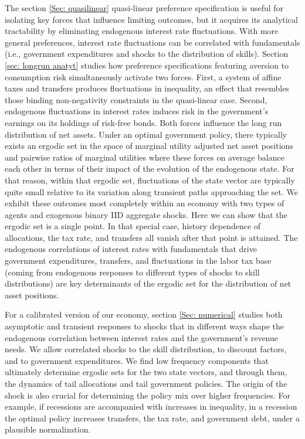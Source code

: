 \documentclass[thmsb,11pt]{article}
\begin{document}
The section \ref{Sec: quasilinear} quasi-linear preference specification is useful for isolating key forces that influence
limiting outcomes, but it acquires its analytical tractability by eliminating endogenous interest rate fluctuations. With more general
preferences, interest rate fluctuations can be correlated with fundamentals (i.e., government expenditures and shocks to the distribution
of skills). Section \ref{sec: longrun anatyt} studies how preference specifications
featuring aversion to consumption risk simultaneously activate two forces.  First, a system of affine taxes and transfers produces fluctuations in inequality, an  effect that resembles those binding non-negativity constraints in the quasi-linear case.  Second, endogenous fluctuations in interest rates  induces risk in the government's earnings on its holdings of risk-free bonds. Both forces influence the long run distribution of net assets. Under an optimal government policy, there typically exists an ergodic set in the space of marginal utility adjusted net asset positions and pairwise ratios of marginal utilities where these forces on average balance each other in terms of their impact of the evolution of the endogenous
state. For that reason, within that ergodic set, fluctuations of the state vector are typically quite small relative to its variation along transient paths approaching the set. We exhibit these outcomes most completely within an economy with two types of agents and  exogenous binary IID aggregate shocks.  Here  we can show that the ergodic set is a single point. In that special case, history dependence
of allocations, the tax rate, and transfers all vanish after that point is attained. The endogenous correlations of interest rates with fundamentals
that  drive government
expenditures, transfers, and  fluctuations in the labor tax base (coming from endogenous responses to different types of shocks to skill distributions) are key determinants of the ergodic set for the distribution of net asset positions.

 For a calibrated version of our economy, section \ref{Sec: numerical} studies both asymptotic and transient responses to shocks
 that    in different ways shape the endogenous correlation between interest rates and the government's revenue needs.  We allow correlated shocks
 to the skill distribution, to discount factors, and to government expenditures.
We find  low frequency components that ultimately determine  ergodic sets for the two state vectors, and through them, the dynamics of tail allocations and tail government policies.  The origin of the shock is also crucial for determining the policy mix over higher frequencies. For example, if recessions are accompanied with increases in inequality, in a recession the optimal policy increases  transfers, the tax rate, and   government debt, under a plausible
normalization.
\end{document}
